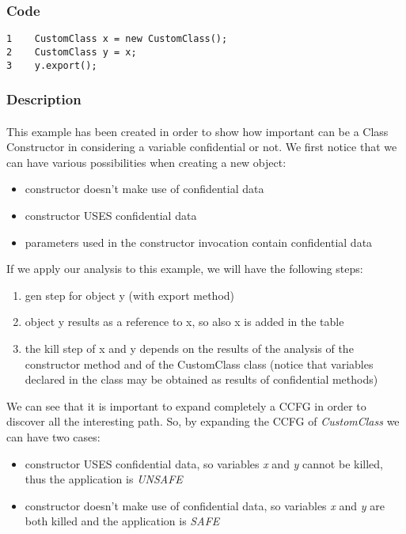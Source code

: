 \documentclass[letterpaper,twocolumn,10pt]{article}
\begin{document}
\subsubsection{Code}
\begin{verbatim}
1    CustomClass x = new CustomClass();
2    CustomClass y = x;
3    y.export();
\end{verbatim}

\subsubsection{Description}
\paragraph{}
This example has been created in order to show how important can be a Class Constructor in considering a variable confidential or not. We first notice that we can have various possibilities when creating a new object:
\begin{itemize}
  \item constructor doesn't make use of confidential data
  \item constructor USES confidential data
  \item parameters used in the constructor invocation contain confidential data
\end{itemize}

If we apply our analysis to this example, we will have the following steps:

\begin{enumerate}
\item gen step for object y (with export method)
\item object y results as a reference to x, so also x is added in the table
\item the kill step of x and y depends on the results of the analysis of the constructor method and of the CustomClass class (notice that variables declared in the class may be obtained as results of confidential methods)
\end{enumerate}

We can see that it is important to expand completely a CCFG in order to discover all the interesting path. So, by expanding the CCFG of \emph{CustomClass} we can have two cases:
\begin{itemize}
  \item constructor USES confidential data, so variables \emph{x} and \emph{y} cannot be killed, thus the application is \emph{UNSAFE}
  \item constructor doesn't make use of confidential data, so variables \emph{x} and \emph{y} are  both killed and the application is \emph{SAFE}
\end{itemize}
\end{document}
